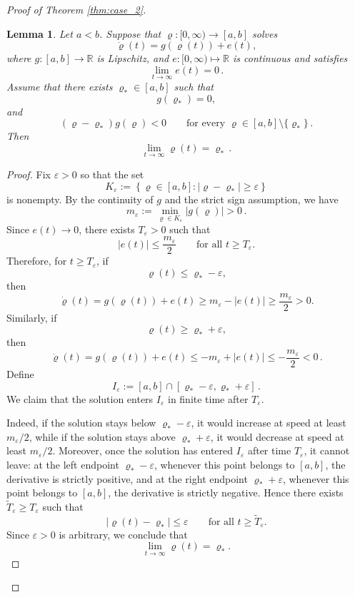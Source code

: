 \documentclass[10pt]{article}
\newtheorem{lemma}[theorem]{Lemma}
\theoremstyle{definition}
\theoremstyle{definition}
\numberwithin{equation}{section}
\newcommand{\R}{\mathbb{R}}
\begin{document}
\begin{proof}[Proof of Theorem \ref{thm:case_2}]
\begin{lemma}
\label{lem:pt_lem}
Let $a < b$.
Suppose that $\varrho:[0,\infty)\to[a,b]$ solves
\[
\dot{\varrho}(t)=g(\varrho(t))+e(t),
\]
where $g:[a,b]\to\mathbb{R}$ is Lipschitz, and $e: [0, \infty) \mapsto \R$ is continuous and satisfies
\[
\lim_{t\to\infty} e(t)=0 \, .
\]
Assume that there exists $\varrho_*\in[a,b]$ such that
\[
g(\varrho_*)=0,
\]
and
\begin{equation*}
(\varrho - \varrho_*) g (\varrho) < 0 \qquad \text{for every } \varrho \in [a,b] \setminus \{\varrho_*\} \, .
\end{equation*}
Then
\[
\lim_{t\to\infty}\varrho(t)=\varrho_* \, .
\]
\end{lemma}
\begin{proof}
Fix $\varepsilon>0$ so that the set
\begin{equation*}
K_{\varepsilon} := \left\{ \varrho \in [a,b]: |\varrho - \varrho_*| \geq \varepsilon \right\}
\end{equation*}
is nonempty.
By the continuity of $g$ and the strict sign assumption, we have
\[
m_\varepsilon
:= \min_{\varrho \in K_{\varepsilon}} |g(\varrho)| > 0 \, .
\]
Since $e(t)\to0$, there exists $T_\varepsilon>0$ such that
\[
|e(t)|\leq \frac{m_\varepsilon}{2}
\qquad\text{for all }t\geq T_\varepsilon.
\]
Therefore, for $t\geq T_\varepsilon$, if
\[
\varrho(t)\leq \varrho_*-\varepsilon,
\]
then
\[
\dot{\varrho}(t)
=
g(\varrho(t))+e(t)
\geq
m_\varepsilon-|e(t)|
\geq
\frac{m_\varepsilon}{2}>0.
\]
Similarly, if
\[
\varrho(t)\geq \varrho_*+\varepsilon,
\]
then
\[
\dot{\varrho}(t)
=
g(\varrho(t))+e(t)
\leq
-m_\varepsilon+|e(t)|
\leq
-\frac{m_\varepsilon}{2}<0 \, .
\]
Define 
\begin{equation*}
    I_{\varepsilon} := [a, b] \cap [\varrho_* - \varepsilon, \varrho_* + \varepsilon] \, . 
\end{equation*}
We claim that the solution enters $I_{\varepsilon}$ in finite time after $T_{\varepsilon}$.

Indeed, if the solution stays below
$\varrho_*-\varepsilon$, it would increase at speed at least $m_\varepsilon/2$, while if the solution stays above
$\varrho_*+\varepsilon$, it would decrease at speed at least $m_\varepsilon/2$.
Moreover, once the solution has entered $I_{\varepsilon}$ after time $T_\varepsilon$, it cannot leave:
at the left endpoint $\varrho_*-\varepsilon$, whenever this point belongs to $[a,b]$, the derivative is strictly positive, and at the right endpoint
$\varrho_*+\varepsilon$, whenever this point belongs to $[a,b]$, the derivative is strictly negative. 
Hence there exists
$\widetilde{T}_\varepsilon\geq T_\varepsilon$ such that
\[
|\varrho(t)-\varrho_*|\leq\varepsilon
\qquad\text{for all }t\geq \widetilde{T}_\varepsilon.
\]
Since $\varepsilon>0$ is arbitrary, we conclude that
\[
\lim_{t\to\infty}\varrho(t)=\varrho_*.
\]
\end{proof}


\end{proof}
\end{document}
